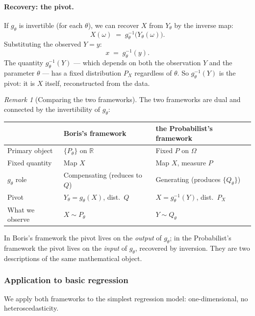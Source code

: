 \documentclass[a4paper,oneside,12pt]{extarticle}
\theoremstyle{plain}
\theoremstyle{definition}
\theoremstyle{remark}
\newtheorem{remark}[proposition]{Remark}
\begin{document}
\paragraph{Recovery: the pivot.}
If $g_\theta$ is invertible (for each $\theta$), we can recover $X$
from $Y_\theta$ by the inverse map:
\[
  X(\omega) \;=\; g_\theta^{-1}\!\bigl(Y_\theta(\omega)\bigr).
\]
Substituting the observed $Y = y$:
\[
  x \;=\; g_\theta^{-1}(y).
\]
The quantity $g_\theta^{-1}(Y)$ — which depends on both the
observation $Y$ and the parameter $\theta$ — has a fixed
distribution $P_X$ regardless of $\theta$.  So $g_\theta^{-1}(Y)$
is the pivot: it is $X$ itself, reconstructed from the data.

\begin{remark}[Comparing the two frameworks]
The two frameworks are dual and connected by the invertibility of
$g_\theta$:
\begin{center}
\small
\begin{tabular}{lll}
\toprule
 & Boris's framework & the Probabilist's framework \\
\midrule
Primary object & $\{P_\theta\}$ on $\mathbb{R}$ & Fixed $P$ on $\Omega$ \\
Fixed quantity & Map $X$ & Map $X$, measure $P$ \\
$g_\theta$ role & Compensating (reduces to $Q$) & Generating (produces $\{Q_\theta\}$) \\
Pivot & $Y_\theta = g_\theta(X)$, dist.\ $Q$ & $X = g_\theta^{-1}(Y)$, dist.\ $P_X$ \\
What we observe & $X \sim P_\theta$ & $Y \sim Q_\theta$ \\
\bottomrule
\end{tabular}
\end{center}
In Boris's framework the pivot lives on the \emph{output} of $g_\theta$;
in the Probabilist's framework the pivot lives on the \emph{input} of $g_\theta$,
recovered by inversion.  They are two descriptions of the same
mathematical object.
\end{remark}


\subsubsection*{Application to basic regression}

We apply both frameworks to the simplest regression model:
one-dimensional, no heteroscedasticity.
\end{document}
